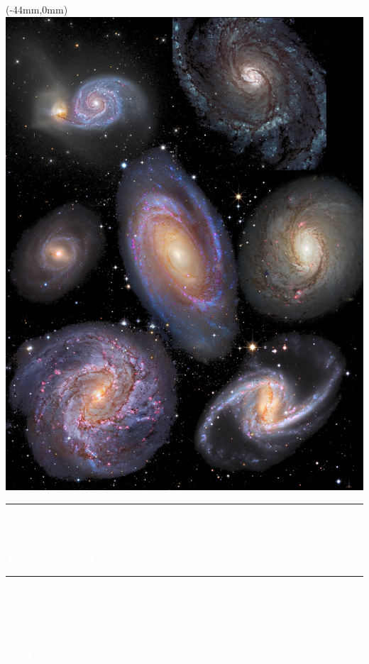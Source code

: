 \documentclass[15pt,a4paper,oneside,openright]{report}
\newcommand{\HRule}{\rule{\linewidth}{0.5mm}}
\begin{document}
\begin{titlepage}
\begin{center}

\begin{textblock*}{297mm}(-44mm,0mm)
\includegraphics[scale=1.]{figures/galaxies_rotated.png}
\end{textblock*}

{\color{white}\HRule \\[0.3cm]}
\textcolor{white}{\huge \bfseries PTS/Modeling: \\ A User Friendly Guide}\\[0.3cm]
{\color{white}\HRule \\[0.3cm]}

\vspace{3.0cm}
\textcolor{white}{\textsc{\Large Ghent University, 2018}\\[1.5cm]}


\vfill 
\textcolor{white}{\textsc{\large Angelos Nersesian\\Sam Verstocken}\\[0.5cm]}


\end{center} 
\end{titlepage}
\end{document}
